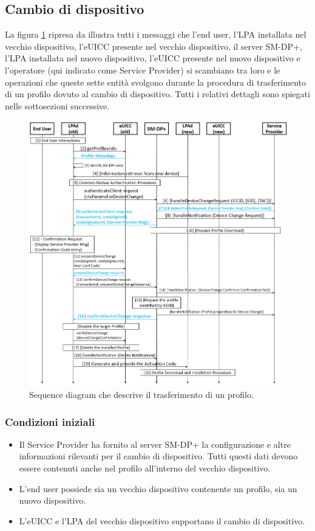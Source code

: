 \documentclass[10pt, oneside]{book}
\begin{document}
\subsection{Cambio di dispositivo}\label{sec:device-change}
La figura \ref{fig:device-change} ripresa da \cite{GSMA-docs-new} illustra tutti i messaggi che l'end user, l'LPA installata nel vecchio dispositivo, l'eUICC presente nel vecchio dispositivo, il server SM-DP+, l'LPA installata nel nuovo dispositivo, l'eUICC presente nel nuovo dispositivo e l'operatore (qui indicato come Service Provider) si scambiano tra loro e le operazioni che queste sette entità svolgono durante la procedura di trasferimento di un profilo dovuto al cambio di dispositivo. Tutti i relativi dettagli \cite{GSMA-docs-new} sono spiegati nelle sottosezioni successive.
\begin{figure}
\includegraphics[width=\linewidth]{device-change.png}
\caption{Sequence diagram che descrive il trasferimento di un profilo.}
\label{fig:device-change}
\end{figure}

\subsubsection{Condizioni iniziali}
\begin{itemize}
\item Il Service Provider ha fornito al server SM-DP+ la configurazione e altre informazioni rilevanti per il cambio di dispositivo. Tutti questi dati devono essere contenuti anche nel profilo all'interno del vecchio dispositivo.
\item L'end user possiede sia un vecchio dispositivo contenente un profilo, sia un nuovo dispositivo.
\item L'eUICC e l'LPA del vecchio dispositivo supportano il cambio di dispositivo.
\end{itemize}
\end{document}
